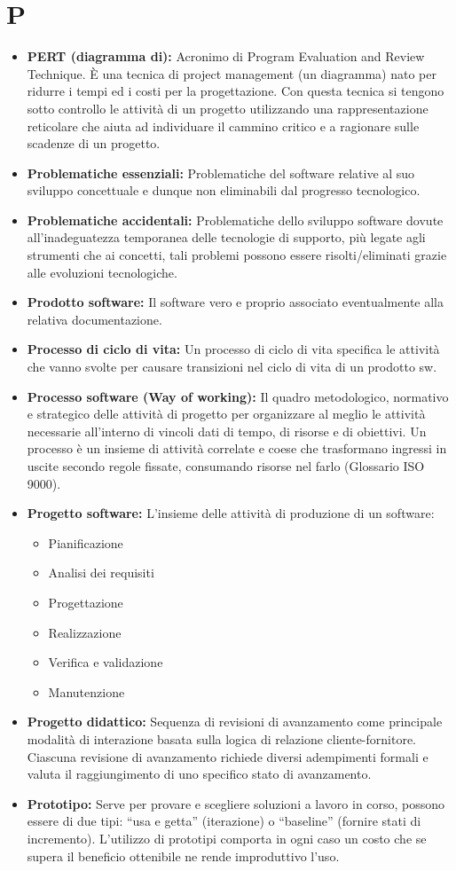 \documentclass[a4paper]{report}
\newcommand{\mychapter}[2]{
	\setcounter{chapter}{#1}
	\setcounter{section}{0}
	\setcounter{subsection}{1}
	\chapter*{#2}
	\addcontentsline{toc}{chapter}{#2}
}
\begin{document}
	\mychapter{14}{P}
		\begin{itemize}
			\item \textbf{PERT (diagramma di):} Acronimo di Program Evaluation and Review Technique. È una tecnica di project management 
			(un diagramma) nato per ridurre i tempi ed i costi per la progettazione. Con questa tecnica si tengono sotto 
			controllo le attività di un progetto utilizzando una rappresentazione reticolare che aiuta ad individuare il 
			cammino critico e a ragionare sulle scadenze di un progetto.
			\item \textbf{Problematiche essenziali:} Problematiche del software relative al suo sviluppo concettuale e dunque 
			non eliminabili dal progresso tecnologico.
			\item \textbf{Problematiche accidentali:} Problematiche dello sviluppo software dovute all’inadeguatezza temporanea 
			delle tecnologie di supporto, più legate agli strumenti che ai concetti, tali problemi possono essere risolti/eliminati 
			grazie alle evoluzioni tecnologiche.
			\item \textbf{Prodotto software:} Il software vero e proprio associato eventualmente alla relativa documentazione.
			\item \textbf{Processo di ciclo di vita:} Un processo di ciclo di vita specifica le attività che vanno svolte per 
			causare transizioni nel ciclo di vita di un prodotto sw.
			\item \textbf{Processo software (Way of working):} Il quadro metodologico, normativo e strategico delle attività di 
			progetto per organizzare al meglio le attività necessarie all’interno di vincoli dati di tempo, di risorse e di obiettivi. 
			Un processo è un insieme di attività correlate e coese che trasformano ingressi in uscite secondo regole fissate, consumando 
			risorse nel farlo (Glossario ISO 9000).
			\item \textbf{Progetto software:} L’insieme delle attività di produzione di un software:
			\begin{itemize}
				\item  Pianificazione
			  	\item  Analisi dei requisiti
			  	\item  Progettazione
			  	\item  Realizzazione
			  	\item  Verifica e validazione
			  	\item  Manutenzione
			\end{itemize}
			\item \textbf{Progetto didattico:} Sequenza di revisioni di avanzamento come principale modalità di interazione basata 
			sulla logica di relazione cliente-fornitore. Ciascuna revisione di avanzamento richiede diversi adempimenti formali e 
			valuta il raggiungimento di uno specifico stato di avanzamento.
			\item \textbf{Prototipo:} Serve per provare e scegliere soluzioni a lavoro in corso, possono essere di due tipi: “usa e getta” 
			(iterazione) o “baseline” (fornire stati di incremento). L’utilizzo di prototipi comporta in ogni caso un costo che se supera 
			il beneficio ottenibile ne rende improduttivo l’uso.
		\end{itemize}
		
\end{document}
